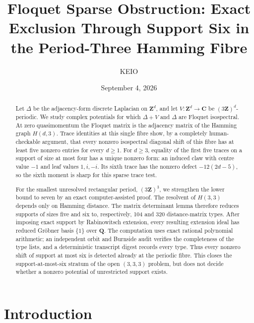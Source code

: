 \documentclass[11pt,reqno]{amsart}
\title[Floquet sparse obstruction]{Floquet Sparse Obstruction:
Exact Exclusion Through Support Six in the Period-Three Hamming Fibre}
\author{KEIO}
\date{September 4, 2026}
\theoremstyle{definition}
\theoremstyle{remark}
\newcommand{\C}{\mathbf C}
\newcommand{\Q}{\mathbf Q}
\newcommand{\Z}{\mathbf Z}
\begin{document}
\begin{abstract}
Let $\Delta$ be the adjacency-form discrete Laplacian on $\Z^d$, and let
$V\colon\Z^d\to\C$ be $(3\Z)^d$-periodic.  We study complex potentials for
which $\Delta+V$ and $\Delta$ are Floquet isospectral.  At zero
quasimomentum the Floquet matrix is the adjacency matrix of the Hamming graph
$H(d,3)$.  Trace identities at this single fibre show, by a completely
human-checkable argument, that every nonzero isospectral diagonal shift of
this fibre has at least five nonzero entries for every $d\geq1$.  For
$d\geq3$, equality of the first five traces on a support of size at most four
has a unique nonzero form: an induced claw with centre value $-1$ and leaf
values $1,i,-i$.  Its sixth trace has the nonzero defect $-12(2d-5)$, so the
sixth moment is sharp for this sparse trace test.

For the smallest unresolved rectangular period, $(3\Z)^3$, we strengthen the
lower bound to seven by an exact computer-assisted proof.  The resolvent of
$H(3,3)$ depends only on Hamming distance.  The matrix determinant lemma
therefore reduces supports of sizes five and six to, respectively, 104 and
320 distance-matrix types.  After imposing exact support by Rabinowitsch
extension, every resulting extension ideal has reduced Gr\"obner basis
$\{1\}$ over $\Q$.  The computation uses exact rational polynomial arithmetic; an
independent orbit and Burnside audit verifies the completeness of the type
lists, and a deterministic transcript digest records every type.  Thus every
nonzero shift of support at most six is detected already at the periodic
fibre.  This closes the support-at-most-six stratum of the open $(3,3,3)$
problem, but does not decide whether a nonzero potential of unrestricted
support exists.
\end{abstract}

\maketitle

\section{Introduction}
\end{document}
